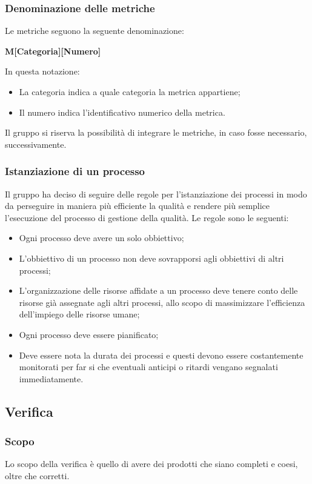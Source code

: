 \documentclass[../norme_di_progetto.tex]{subfiles}
\begin{document}
\subsubsection{Denominazione delle metriche}
Le metriche seguono la seguente denominazione:
\begin{center}
    \textbf{M[Categoria][Numero]}
\end{center}
In questa notazione:
\begin{itemize}
    \item La categoria indica a quale categoria la metrica appartiene;
    \item Il numero indica l'identificativo numerico della metrica.
\end{itemize}
Il gruppo si riserva la possibilità di integrare le metriche, in caso fosse necessario, successivamente.

\subsubsection{Istanziazione di un processo}
Il gruppo ha deciso di seguire delle regole per l'istanziazione dei processi in modo da perseguire in maniera più efficiente la qualità e rendere più semplice l'esecuzione del processo di gestione della qualità. Le regole sono le seguenti:
\begin{itemize}
    \item Ogni processo deve avere un solo obbiettivo;
    \item L'obbiettivo di un processo non deve sovrapporsi agli obbiettivi di altri processi;
    \item L'organizzazione delle risorse affidate a un processo deve tenere conto delle risorse già assegnate agli altri processi, allo scopo di massimizzare l'efficienza dell'impiego delle risorse umane;
    \item Ogni processo deve essere pianificato;
    \item Deve essere nota la durata dei processi e questi devono essere costantemente monitorati per far si che eventuali anticipi o ritardi vengano segnalati immediatamente.
\end{itemize}



\subsection{Verifica}

\subsubsection{Scopo}
Lo scopo della verifica è quello di avere dei prodotti che siano completi e coesi, oltre che corretti.
\end{document}

